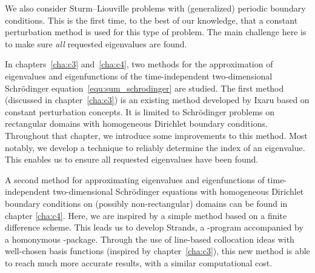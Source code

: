 We also consider Sturm--Liouville problems with (generalized) periodic boundary conditions. This is the first time, to the best of our knowledge, that a constant perturbation method is used for this type of problem. The main challenge here is to make sure \emph{all} requested eigenvalues are found.

In chapters~\ref{cha:c3} and~\ref{cha:c4}, two methods for the approximation of eigenvalues and eigenfunctions of the time-independent two-dimensional Schrödinger equation~\eqref{equ:sum_schrodinger}  are studied. The first method (discussed in chapter~\ref{cha:c3}) is an existing method developed by Ixaru based on constant perturbation concepts. It is limited to Schrödinger problems on rectangular domains with homogeneous Dirichlet boundary conditions. Throughout that chapter, we introduce some improvements to this method. Most notably, we develop a technique to reliably determine the index of an eigenvalue. This enables us to ensure all requested eigenvalues have been found.

A second method for approximating eigenvalues and eigenfunctions of time-independent two-dimensional Schrödinger equations with homogeneous Dirichlet boundary conditions on (possibly non-rectangular) domains can be found in chapter \ref{cha:c4}. Here, we are inspired by a simple method based on a finite difference scheme. This leads us to develop Strands, a \cpp{}-program accompanied by a homonymous \lpython{}-package. Through the use of line-based collocation ideas with well-chosen basis functions (inspired by chapter~\ref{cha:c3}), this new method is able to reach much more accurate results, with a similar computational cost.


